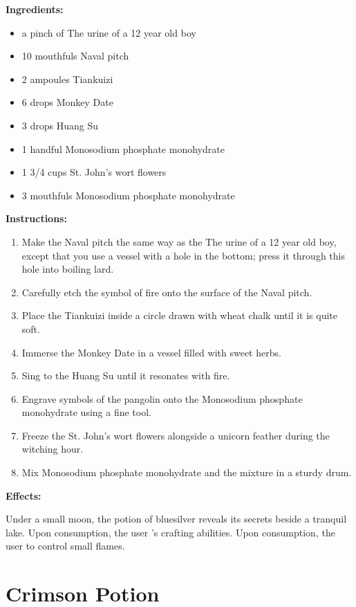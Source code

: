 \documentclass{article}
\begin{document}
\textbf{Ingredients:}

\begin{itemize}
  \item a pinch of The urine of a 12 year old boy
  \item 10 mouthfuls Naval pitch
  \item 2 ampoules Tiankuizi
  \item 6 drops Monkey Date
  \item 3 drops Huang Su
  \item 1 handful Monosodium phosphate monohydrate
  \item 1 3/4 cups St. John's wort flowers
  \item 3 mouthfuls Monosodium phosphate monohydrate
\end{itemize}

\textbf{Instructions:}

\begin{enumerate}
  \item Make the Naval pitch the same way as the The urine of a 12 year old boy, except that you use a vessel with a hole in the bottom; press it through this hole into boiling lard.
  \item Carefully etch the symbol of fire onto the surface of the Naval pitch.
  \item Place the Tiankuizi inside a circle drawn with wheat chalk until it is quite soft.
  \item Immerse the Monkey Date in a vessel filled with sweet herbs.
  \item Sing to the Huang Su until it resonates with fire.
  \item Engrave symbols of the pangolin onto the Monosodium phosphate monohydrate using a fine tool.
  \item Freeze the St. John's wort flowers alongside a unicorn feather during the witching hour.
  \item Mix Monosodium phosphate monohydrate and the mixture in a sturdy drum.
\end{enumerate}

\textbf{Effects:}

Under a small moon, the potion of bluesilver reveals its secrets beside a tranquil lake. Upon consumption, the user 's crafting abilities. Upon consumption, the user to control small flames.

\newpage
\section*{Crimson Potion}
\end{document}
